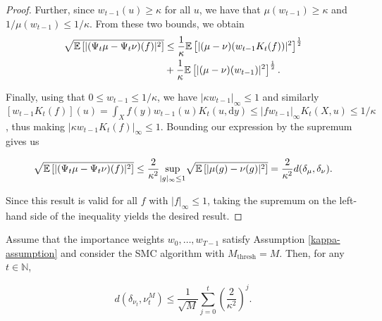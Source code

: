 \begin{proof}
  Further, since $w_{t-1}(u) \ge \kappa$ for all $u$, we have that $\mu(w_{t-1}) \ge \kappa$ and $1 / \mu(w_{t-1}) \le 1/\kappa$. From these two bounds, we obtain
  \begin{equation*}
    \begin{aligned}
      \sqrt{\mathbb{E}\left[|(\Psi_t\mu - \Psi_t\nu)(f)|^2\right]}
      &\le \frac1\kappa\mathbb{E}\left[|(\mu - \nu)(w_{t-1}K_t(f))|^2\right]^{\frac12}\\
      &+ \frac1\kappa\mathbb{E}\left[|(\mu - \nu)(w_{t-1})|^2\right]^{\frac12}.
    \end{aligned}
  \end{equation*}


  Finally, using that $0 \le w_{t-1} \le 1/\kappa$, we have $|\kappa w_{t-1}|_\infty \le 1$ and similarly $[w_{t-1}K_t(f)](u) = \int_X f(y)w_{t-1}(u)K_t(u, \text{d}y) \leq |fw_{t-1}|_\infty K_t(X, u) \leq 1 / \kappa$, thus making $|\kappa w_{t-1}K_t(f)|_\infty \leq 1$. Bounding our expression by the supremum gives us 

  \begin{equation*}
    \sqrt{\mathbb{E}\left[|(\Psi_t\mu - \Psi_t\nu)(f)|^2\right]} \le \frac2{\kappa^2}\underset{|g|_\infty \le 1}{\text{sup}} \sqrt{\mathbb{E}\left[|\mu(g) - \nu(g)|^2\right]} =  \frac2{\kappa^2}d(\delta_\mu, \delta_\nu).
  \end{equation*}

  Since this result is valid for all $f$ with $|f|_\infty \le 1$, taking the supremum on the left-hand side of the inequality yields the desired result.
\end{proof}

\begin{theorem}\label{smc-convergence}
  Assume that the importance weights $w_0, \ldots, w_{T-1}$ satisfy Assumption \ref{kappa-assumption} and consider the SMC algorithm with $M_\text{thresh} = M$. Then, for any $t \in \mathbb{N}$,

  \begin{equation*}
    d(\delta_{\nu_t}, \nu_t^M) \leq \frac1{\sqrt{M}}\sum_{j=0}^t\left(\frac2{\kappa^2}\right)^j.
  \end{equation*}
\end{theorem}

